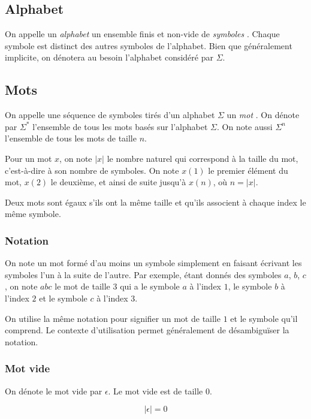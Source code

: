 \subsection{Alphabet}

On appelle un \og \textit{alphabet} \fg{} un ensemble finis et non-vide de \og \textit{symboles} \fg{}.
Chaque symbole est distinct des autres symboles de l'alphabet.
Bien que généralement implicite, on dénotera au besoin l'alphabet considéré par $\Sigma$.

\subsection{Mots}

On appelle une séquence de symboles tirés d'un alphabet $\Sigma$ un \og \textit{mot} \fg{}.
On dénote par $\Sigma^*$ l'ensemble de tous les mots basés sur l'alphabet $\Sigma$.
On note aussi $\Sigma^n$ l'ensemble de tous les mots de taille $n$.

Pour un mot $x$, on note $|x|$ le nombre naturel qui correspond à la taille du mot, c'est-à-dire à son nombre de symboles.
On note $x(1)$ le premier élément du mot, $x(2)$ le deuxième, et ainsi de suite jusqu'à $x(n)$, où $n = |x|$.

Deux mots sont égaux s'ils ont la même taille et qu'ils associent à chaque index le même symbole.

\subsubsection{Notation}

On note un mot formé d'au moins un symbole simplement en faisant écrivant les symboles l'un à la suite de l'autre.
Par exemple, étant donnés des symboles $a$, $b$, $c$, on note $abc$ le mot de taille $3$ qui a le symbole $a$ à l'index $1$, le symbole $b$ à l'index $2$ et le symbole $c$ à l'index $3$.

On utilise la même notation pour signifier un mot de taille $1$ et le symbole qu'il comprend.
Le contexte d'utilisation permet généralement de désambiguïser la notation. 

\subsubsection{Mot vide}

On dénote le mot vide par $\epsilon$.
Le mot vide est de taille $0$.

\[
|\epsilon| = 0
\]

